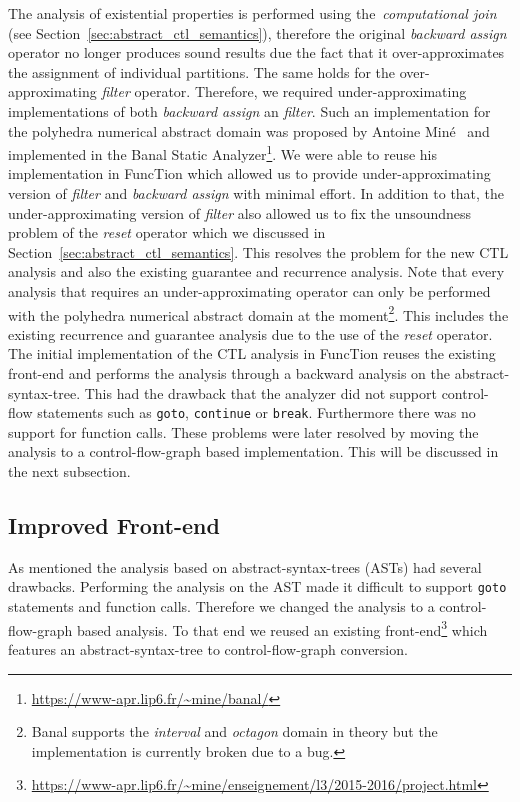\documentclass[11pt,a4paper,titlepage]{article}
\theoremstyle{definition}
\begin{document}
The analysis of existential properties is performed using the~\textit{computational join} (see Section~\ref{sec:abstract_ctl_semantics}), 
therefore the original \textit{backward assign} operator no longer produces sound results due the 
fact that it over-approximates the assignment of individual partitions. The same holds for the over-approximating \textit{filter} operator.
Therefore, we required under-approximating implementations of both \textit{backward assign} an \textit{filter}.
Such an implementation for the polyhedra numerical abstract domain was proposed by 
Antoine Miné~\cite{DBLP:journals/entcs/Mine12} and implemented in the Banal Static Analyzer\footnote{\url{https://www-apr.lip6.fr/~mine/banal/}}.
We were able to reuse his implementation in FuncTion which allowed us to provide under-approximating 
version of \textit{filter} and \textit{backward assign} with minimal effort. 
In addition to that, the under-approximating version of \textit{filter} also allowed us to fix the unsoundness problem of the
\textit{reset} operator which we discussed in Section~\ref{sec:abstract_ctl_semantics}. This resolves the problem for the 
new CTL analysis and also the existing guarantee and recurrence analysis. 
Note that every analysis that requires an under-approximating operator can only be 
performed with the polyhedra numerical abstract domain at the moment\footnote{Banal supports the 
    \textit{interval} and \textit{octagon} domain in theory but the implementation is currently broken due to a bug.}.
This includes the existing recurrence and guarantee analysis due to the use of the \textit{reset} operator.\\

The initial implementation of the CTL analysis in FuncTion reuses the existing front-end and performs the analysis through a backward analysis 
on the abstract-syntax-tree. This had the drawback that the analyzer did not support control-flow statements such as \texttt{goto}, \texttt{continue}
or \texttt{break}. Furthermore there was no support for function calls.
These problems were later resolved by moving the analysis to a control-flow-graph based implementation. 
This will be discussed in the next subsection. 

\subsection{Improved Front-end}
As mentioned the analysis based on abstract-syntax-trees (ASTs) had several drawbacks. Performing the analysis on the AST made it
difficult to support \texttt{goto} statements and function calls. Therefore we changed the analysis to a control-flow-graph based analysis.
To that end we reused an existing front-end\footnote{\url{https://www-apr.lip6.fr/~mine/enseignement/l3/2015-2016/project.html}}
which features an abstract-syntax-tree to control-flow-graph conversion.\\
\end{document}
